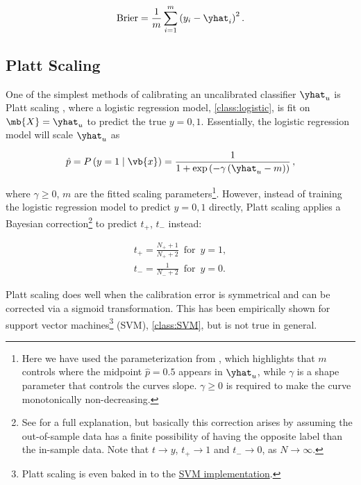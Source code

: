 \begin{equation} \label{eq:calibration:brier}
\text{Brier} = \frac{1}{m} \sum_{i=1}^{m} \left(y_{i} - \yhat_{i}\right)^{2}.
\end{equation}

\subsection{Platt Scaling}
\label{ml_general:calibration:platt}

One of the simplest methods of calibrating
an uncalibrated classifier $\yhat_{u}$ is Platt scaling \cite{platt_scaling},
where a logistic regression model, \cref{class:logistic},
is fit on $\mb{X} = \yhat_{u}$ to predict the true $y = 0, 1$.
Essentially, the logistic regression model will scale $\yhat_{u}$ as

\begin{equation} \label{eq:calibration:platt}
\hat{p} = P\left(y=1 \mid \vb{x}\right) = \frac{1}{1+\exp\left(-\gamma\left(\yhat_{u} - m\right)\right)}\,,
\end{equation}

\noindent where $\gamma \geq 0$, $m$ are the fitted scaling
parameters\footnote{Here we have used the parameterization from \cite{beta_calib},
which highlights that $m$ controls where the midpoint $\hat{p}=\num{0.5}$ appears in $\yhat_{u}$,
while $\gamma$ is a shape parameter that controls the curves slope.
$\gamma \geq 0$ is required to make the curve monotonically non-decreasing.}. However,
instead of training the logistic regression model to predict $y = 0, 1$ directly,
Platt scaling applies a Bayesian correction\footnote{See \cite{platt_scaling} for a full explanation,
but basically this correction arises by assuming the out-of-sample data
has a finite possibility of having the opposite label than the in-sample data.
Note that $t \to y$, $t_{+} \to 1$ and $t_{-} \to 0$, as $N \to \infty$.} to
predict $t_{+}$, $t_{-}$ instead:

\begin{equation} \label{eq:calibration:platt_t}
\begin{gathered}
t_{+} = \frac{N_{+}+1}{N_{+}+2} \enspace \text{for} \enspace y = 1, \\
t_{-}= \frac{1}{N_{-}+2} \enspace \text{for} \enspace y = 0.
\end{gathered}
\end{equation}

Platt scaling does well when the calibration error is symmetrical \cite{10.1145/1102351.1102430}
and can be corrected via a sigmoid transformation.
This has been empirically shown \cite{platt_scaling} for
support vector machines\footnote{Platt scaling
is even baked in to the \sklearn
\href{https://scikit-learn.org/stable/modules/svm.html\#scores-and-probabilities}{SVM implementation}.} (SVM), \cref{class:SVM},
but is not true in general.

